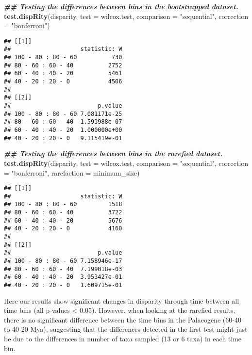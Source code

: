 \documentclass[
]{book}
\newenvironment{Shaded}{\begin{snugshade}}{\end{snugshade}}
\newcommand{\AttributeTok}[1]{\textcolor[rgb]{0.13,0.29,0.53}{#1}}
\newcommand{\DocumentationTok}[1]{\textcolor[rgb]{0.56,0.35,0.01}{\textbf{\textit{#1}}}}
\newcommand{\FunctionTok}[1]{\textcolor[rgb]{0.13,0.29,0.53}{\textbf{#1}}}
\newcommand{\NormalTok}[1]{#1}
\newcommand{\StringTok}[1]{\textcolor[rgb]{0.31,0.60,0.02}{#1}}
\begin{document}
\begin{Shaded}
\begin{Highlighting}[]
\DocumentationTok{\#\# Testing the differences between bins in the bootstrapped dataset.}
\FunctionTok{test.dispRity}\NormalTok{(disparity, }\AttributeTok{test =}\NormalTok{ wilcox.test, }\AttributeTok{comparison =} \StringTok{"sequential"}\NormalTok{,}
    \AttributeTok{correction =} \StringTok{"bonferroni"}\NormalTok{)}
\end{Highlighting}
\end{Shaded}

\begin{verbatim}
## [[1]]
##                    statistic: W
## 100 - 80 : 80 - 60          730
## 80 - 60 : 60 - 40          2752
## 60 - 40 : 40 - 20          5461
## 40 - 20 : 20 - 0           4506
## 
## [[2]]
##                         p.value
## 100 - 80 : 80 - 60 7.081171e-25
## 80 - 60 : 60 - 40  1.593988e-07
## 60 - 40 : 40 - 20  1.000000e+00
## 40 - 20 : 20 - 0   9.115419e-01
\end{verbatim}

\begin{Shaded}
\begin{Highlighting}[]
\DocumentationTok{\#\# Testing the differences between bins in the rarefied dataset.}
\FunctionTok{test.dispRity}\NormalTok{(disparity, }\AttributeTok{test =}\NormalTok{ wilcox.test, }\AttributeTok{comparison =} \StringTok{"sequential"}\NormalTok{,}
    \AttributeTok{correction =} \StringTok{"bonferroni"}\NormalTok{, }\AttributeTok{rarefaction  =}\NormalTok{ minimum\_size)}
\end{Highlighting}
\end{Shaded}

\begin{verbatim}
## [[1]]
##                    statistic: W
## 100 - 80 : 80 - 60         1518
## 80 - 60 : 60 - 40          3722
## 60 - 40 : 40 - 20          5676
## 40 - 20 : 20 - 0           4160
## 
## [[2]]
##                         p.value
## 100 - 80 : 80 - 60 7.158946e-17
## 80 - 60 : 60 - 40  7.199018e-03
## 60 - 40 : 40 - 20  3.953427e-01
## 40 - 20 : 20 - 0   1.609715e-01
\end{verbatim}

Here our results show significant changes in disparity through time between all time bins (all p-values \textless{} 0.05).
However, when looking at the rarefied results, there is no significant difference between the time bins in the Palaeogene (60-40 to 40-20 Mya), suggesting that the differences detected in the first test might just be due to the differences in number of taxa sampled (13 or 6 taxa) in each time bin.
\end{document}
